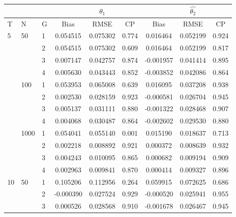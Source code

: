 \begin{tabular}{lll|ccc|ccc}
\toprule
   &      &   &       &  $\hat{\theta_1}$   &             &    & $\hat{\theta_2}$ & \\
   \hline
T & N & G & Bias &    RMSE       &      CP     &    Bias &    RMSE       &      CP           \\
\midrule
5  & 50   & 1 &  0.054515 &  0.075302 &                 0.774 & 0.016464 &  0.052199 &                 0.924 \\
   &      & 2 &  0.054515 &  0.075302 &                 0.609 & 0.016464 &  0.052199 &                 0.817 \\
   &      & 3 &  0.007147 &  0.042757 &                 0.874 &-0.001957 &  0.041414 &                 0.895 \\
   &      & 4 &  0.005630 &  0.043443 &                 0.852 &-0.003852 &  0.042086 &                 0.864 \\
   & 100  & 1 &  0.053953 &  0.065008 &                 0.639 & 0.016095 &  0.037208 &                 0.938 \\
   &      & 2 &  0.002530 &  0.028159 &                 0.923 &-0.000581 &  0.026704 &                 0.945 \\
   &      & 3 &  0.005137 &  0.031111 &                 0.880 &-0.001322 &  0.028468 &                 0.907 \\
   &      & 4 &  0.004068 &  0.030487 &                 0.864 &-0.002602 &  0.029530 &                 0.880 \\
   & 1000 & 1 &  0.054041 &  0.055140 &                 0.001 & 0.015190 &  0.018637 &                 0.713 \\
   &      & 2 &  0.002218 &  0.008892 &                 0.921 & 0.000372 &  0.008639 &                 0.932 \\
   &      & 3 &  0.004243 &  0.010095 &                 0.865 & 0.000682 &  0.009194 &                 0.909 \\
   &      & 4 &  0.002963 &  0.009841 &                 0.870 & 0.000414 &  0.009327 &                 0.896 \\
10 & 50   & 1 &  0.105206 &  0.112956 &                 0.264 & 0.059915 &  0.072625 &                 0.686 \\
   &      & 2 & -0.000390 &  0.027524 &                 0.929 &-0.000520 &  0.025941 &                 0.955 \\
   &      & 3 &  0.000526 &  0.028568 &                 0.910 &-0.001678 &  0.026467 &                 0.945 \\

\end{tabular}
